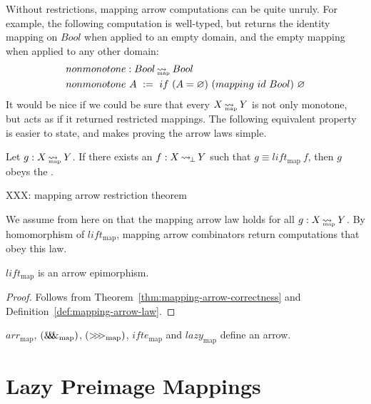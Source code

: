 \documentclass[preprint]{sigplanconf}
\newcommand{\arrow}{\rightsquigarrow}
\newcommand{\arrowlift}{\ensuremath{lift}}
\newcommand{\arrowarr}{\ensuremath{arr}}
\newcommand{\arrowcomp}{\ensuremath{{>}\mspace{-6mu}{>}\mspace{-6mu}{>}}}
\newcommand{\arrowpair}{\ensuremath{\mathit{\&\mspace{-7.5mu}\&\mspace{-7.5mu}\&}}}
\newcommand{\arrowif}{\ensuremath{ifte}}
\newcommand{\arrowlazy}{\ensuremath{lazy}}
\DeclareMathOperator{\botto}{\arrow_{\mspace{-3mu}\bot}}
\newcommand{\map}{_\mathrm{map}}
\DeclareMathOperator{\mapto}{\arrow_{\mspace{-21mu}\map}}
\newcommand{\liftmap}{\arrowlift\map}
\newcommand{\arrmap}{\arrowarr\map}
\newcommand{\compmap}{\arrowcomp\map}
\newcommand{\pairmap}{\arrowpair\map}
\newcommand{\ifmap}{\arrowif\map}
\newcommand{\lazymap}{\arrowlazy\map}
\begin{document}
Without restrictions, mapping arrow computations can be quite unruly.
For example, the following computation is well-typed, but returns the identity mapping on $Bool$ when applied to an empty domain, and the empty mapping when applied to any other domain:
\begin{equation}
\begin{aligned}
	&nonmonotone : Bool \mapto Bool \\
	&nonmonotone~A \ := \ if~(A = \emptyset)~(mapping~id~Bool)~\emptyset
\end{aligned}
\end{equation}
It would be nice if we could be sure that every $X \mapto Y$ is not only monotone, but acts as if it returned restricted mappings.
The following equivalent property is easier to state, and makes proving the arrow laws simple.

\begin{definition}
Let $g : X \mapto Y$. If there exists an $f : X \botto Y$ such that $g \equiv \liftmap~f$, then $g$ obeys the .
\label{def:mapping-arrow-law}
\end{definition}

XXX: mapping arrow restriction theorem

We assume from here on that the mapping arrow law holds for all $g : X \mapto Y$.
By homomorphism of $\liftmap$, mapping arrow combinators return computations that obey this law.

\begin{theorem}
$\liftmap$ is an arrow epimorphism.
\end{theorem}
\begin{proof}
Follows from Theorem~\ref{thm:mapping-arrow-correctness} and Definition~\ref{def:mapping-arrow-law}.
\end{proof}

\begin{corollary}
$\arrmap$, $(\pairmap)$, $(\compmap)$, $\ifmap$ and $\lazymap$ define an arrow.
\end{corollary}



\section{Lazy Preimage Mappings}
\label{sec:lazy-preimage-mappings}
\end{document}
